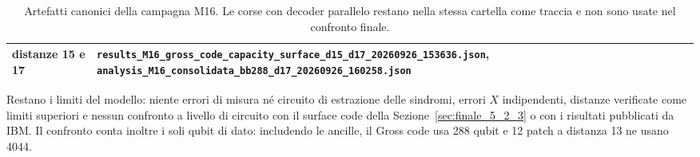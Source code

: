 \begin{onehalfspace}
\begin{table}[H]
\begin{tabularx}{\textwidth}{lX}
distanze 15 e 17 & \texttt{results\_\allowbreak{}M16\_\allowbreak{}gross\_\allowbreak{}code\_\allowbreak{}capacity\_\allowbreak{}surface\_\allowbreak{}d15\_\allowbreak{}d17\_\allowbreak{}20260926\_\allowbreak{}153636.json}, \texttt{analysis\_\allowbreak{}M16\_\allowbreak{}consolidata\_\allowbreak{}bb288\_\allowbreak{}d17\_\allowbreak{}20260926\_\allowbreak{}160258.json} \\
\bottomrule
\end{tabularx}
\caption[Artefatti della campagna M16]{Artefatti canonici della campagna
M16. Le corse con decoder parallelo restano nella stessa cartella come
traccia e non sono usate nel confronto finale.}
\label{tab:app_gross_artefatti}
\end{table}

Restano i limiti del modello: niente errori di misura né circuito di
estrazione delle sindromi, errori $X$ indipendenti, distanze verificate
come limiti superiori e nessun confronto a livello di circuito con il
surface code della Sezione~\ref{sec:finale_5_2_3} o con i risultati
pubblicati da IBM. Il confronto conta inoltre i soli qubit di dato:
includendo le ancille, il Gross code usa 288 qubit e 12 patch a distanza
13 ne usano 4044.

\end{onehalfspace}
